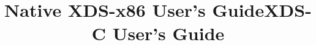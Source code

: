 \FrameIsDeeptrue

\makeindex

\newcommand{\VersionNumber}{2.6}
\newcommand{\BookName}{User's Guide}

\ifonline %
  \ifgencode
  \title{Native XDS-x86 User's Guide}
  \else\ifgenc
  \title{XDS-C User's Guide}
  \else\JNO
  \fi\fi
\fi
